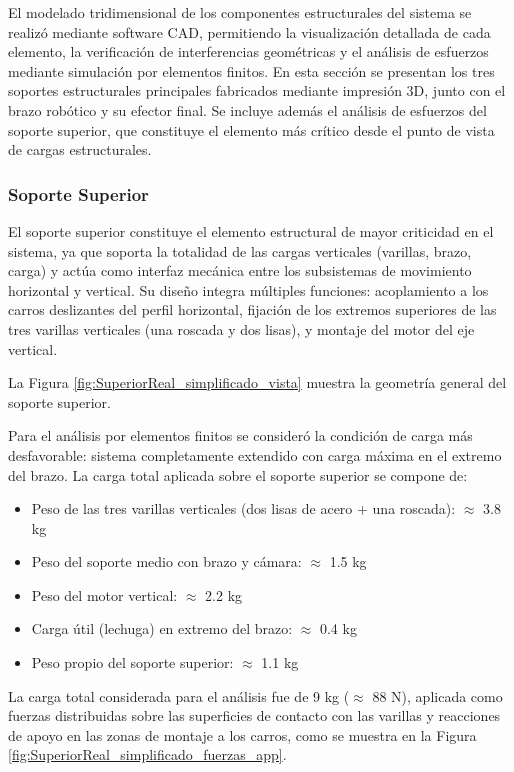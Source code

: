 El modelado tridimensional de los componentes estructurales del sistema se realizó mediante software CAD, permitiendo la visualización detallada de cada elemento, la verificación de interferencias geométricas y el análisis de esfuerzos mediante simulación por elementos finitos. En esta sección se presentan los tres soportes estructurales principales fabricados mediante impresión 3D, junto con el brazo robótico y su efector final. Se incluye además el análisis de esfuerzos del soporte superior, que constituye el elemento más crítico desde el punto de vista de cargas estructurales.

\subsubsection{Soporte Superior}

El soporte superior constituye el elemento estructural de mayor criticidad en el sistema, ya que soporta la totalidad de las cargas verticales (varillas, brazo, carga) y actúa como interfaz mecánica entre los subsistemas de movimiento horizontal y vertical. Su diseño integra múltiples funciones: acoplamiento a los carros deslizantes del perfil horizontal, fijación de los extremos superiores de las tres varillas verticales (una roscada y dos lisas), y montaje del motor del eje vertical.

La Figura \ref{fig:SuperiorReal_simplificado_vista} muestra la geometría general del soporte superior.

Para el análisis por elementos finitos se consideró la condición de carga más desfavorable: sistema completamente extendido con carga máxima en el extremo del brazo. La carga total aplicada sobre el soporte superior se compone de:

\begin{itemize}
    \item Peso de las tres varillas verticales (dos lisas de acero + una roscada): $\approx$ 3.8 kg
    \item Peso del soporte medio con brazo y cámara: $\approx$ 1.5 kg
    \item Peso del motor vertical: $\approx$ 2.2 kg
    \item Carga útil (lechuga) en extremo del brazo: $\approx$ 0.4 kg
    \item Peso propio del soporte superior: $\approx$ 1.1 kg
\end{itemize}

La carga total considerada para el análisis fue de 9 kg ($\approx$ 88 N), aplicada como fuerzas distribuidas sobre las superficies de contacto con las varillas y reacciones de apoyo en las zonas de montaje a los carros, como se muestra en la Figura \ref{fig:SuperiorReal_simplificado_fuerzas_app}.

